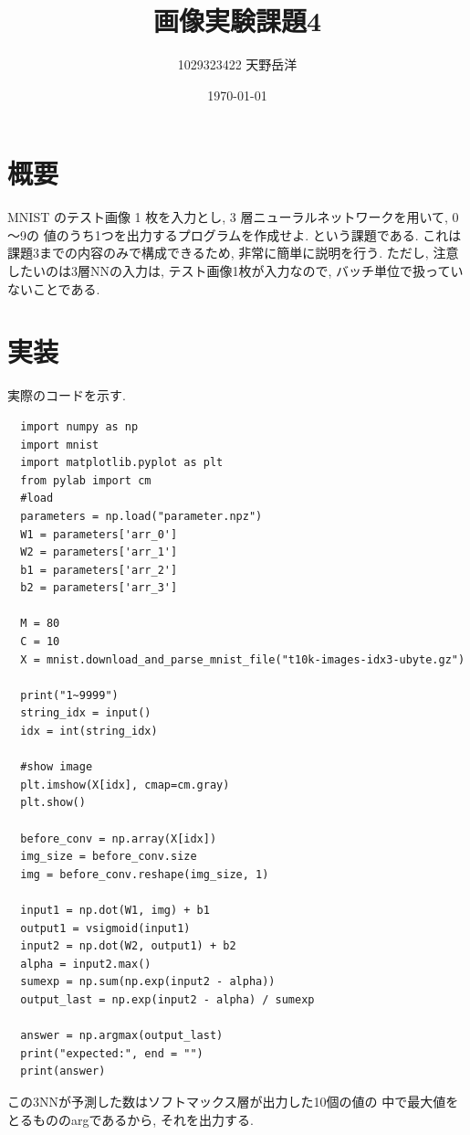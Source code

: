 \documentclass[a4paper,11pt]{jsarticle}
\begin{document}
\title{画像実験課題4}
\author{1029323422 天野岳洋}
\date{\today}
\maketitle
\clearpage

\section{概要}
MNIST のテスト画像 1 枚を入力とし, 3 層ニューラルネットワークを用いて, 0～9の
値のうち1つを出力するプログラムを作成せよ. という課題である.
これは課題3までの内容のみで構成できるため, 非常に簡単に説明を行う.
ただし, 注意したいのは3層NNの入力は, テスト画像1枚が入力なので, 
バッチ単位で扱っていないことである.
\section{実装}
実際のコードを示す.
\begin{lstlisting}
  import numpy as np
  import mnist
  import matplotlib.pyplot as plt
  from pylab import cm
  #load
  parameters = np.load("parameter.npz")
  W1 = parameters['arr_0']
  W2 = parameters['arr_1']
  b1 = parameters['arr_2']
  b2 = parameters['arr_3']

  M = 80
  C = 10
  X = mnist.download_and_parse_mnist_file("t10k-images-idx3-ubyte.gz")

  print("1~9999")
  string_idx = input()
  idx = int(string_idx)

  #show image
  plt.imshow(X[idx], cmap=cm.gray)
  plt.show()

  before_conv = np.array(X[idx])
  img_size = before_conv.size
  img = before_conv.reshape(img_size, 1)

  input1 = np.dot(W1, img) + b1
  output1 = vsigmoid(input1)
  input2 = np.dot(W2, output1) + b2
  alpha = input2.max()
  sumexp = np.sum(np.exp(input2 - alpha))
  output_last = np.exp(input2 - alpha) / sumexp

  answer = np.argmax(output_last)
  print("expected:", end = "")
  print(answer) 
\end{lstlisting}
この3NNが予測した数はソフトマックス層が出力した10個の値の
中で最大値をとるもののargであるから, それを出力する.
\end{document}
